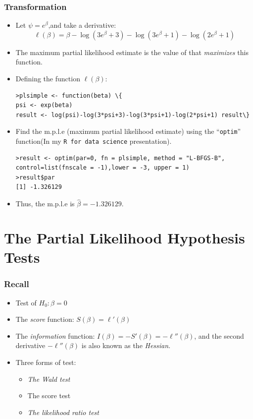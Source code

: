 \documentclass{beamer}
\newcommand{\empr}[1]{{\emph{\color{red}#1}}}
\begin{document}
\pagebreak
\begin{frame}[fragile]
\frametitle{Transformation}
\begin{itemize}
\item Let $\psi=e^{\beta}$,and take a derivative:
\begin{equation}
\ell(\beta) = \beta - \log(3e^{\beta}+3) - \log(3e^{\beta}+1) -  \log(2e^{\beta}+1)
\end{equation}
\item {\color{red}The maximum partial likelihood estimate} is the value of that \empr{maximizes} this function.
\item Defining the function $\ell(\beta)$:
\begin{Verbatim}
>plsimple <- function(beta) \{
psi <- exp(beta)
result <- log(psi)-log(3*psi+3)-log(3*psi+1)-log(2*psi+1) result\}
\end{Verbatim}
\item Find the {\color{red}m.p.l.e} (maximum partial likelihood estimate) using the  ``\texttt{optim}'' function(In my \texttt{R for data science} presentation).
\begin{Verbatim}
>result <- optim(par=0, fn = plsimple, method = "L-BFGS-B",
control=list(fnscale = -1),lower = -3, upper = 1)
>result$par
[1] -1.326129
\end{Verbatim}
\item Thus, the {\color{red}m.p.l.e} is $\hat{\beta}=-1.326129$.
\end{itemize}
\end{frame}

\section{The Partial Likelihood Hypothesis Tests}
\begin{frame}
\frametitle{Recall}
\begin{itemize}
\item Test of $H_0: \beta=0$
\item The \empr{score} function: $S(\beta) = \ell'(\beta)$
\item The \empr{information} function: $I(\beta) = -S'(\beta) = -\ell''(\beta)$, and the second derivative $-\ell''(\beta)$ is also known as the \empr{Hessian}.
\item Three  forms of test:	
\begin{itemize}
	\item \empr{The Wald test}
	\item The score test
	\item  \empr{The likelihood ratio test}
\end{itemize}
\end{itemize}
\end{frame}
\end{document}
